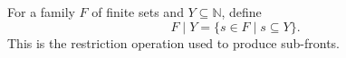 \begin{definition}
For a family $F$ of finite sets and $Y\subseteq\mathbb N$, define
\[
F\mathbin{|}Y=\{s\in F\mid s\subseteq Y\}.
\]
This is the restriction operation used to produce sub-fronts.
\end{definition}
